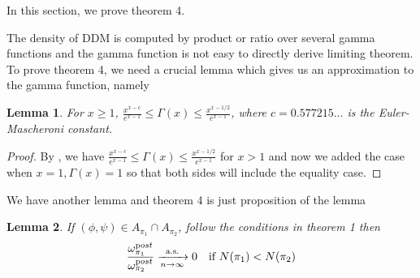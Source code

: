 \documentclass[aoas,preprint]{imsart}
\newtheorem{lemma}{Lemma}
\begin{document}

In this section, we prove theorem 4. 


The density of DDM is computed by product or ratio over several gamma functions and the gamma function is not easy to directly derive limiting theorem.
To prove theorem 4, we need a crucial lemma which gives us an approximation to the gamma function, namely

\begin{lemma}
For $x \geq 1$, $\frac{x^{x - c}}{e^{x - 1}} \leq \Gamma(x) \leq \frac{x^{x-1/2}}{e^{x - 1}}$, where $c = 0.577215...$ is the Euler-Mascheroni constant.
\end{lemma}

\begin{proof}
By \citep{ineq},  we have $\frac{x^{x - c}}{e^{x - 1}} \leq \Gamma(x) \leq \frac{x^{x-1/2}}{e^{x - 1}}$ for $x > 1$ and now we added the case when $x = 1, \Gamma(x) = 1$ so that both sides will include the equality case. 
\end{proof}





We have another lemma and theorem 4 is just proposition of the lemma
\begin{lemma}
 If $(\phi, \psi) \in A_{\pi_1} \cap A_{\pi_2}$, follow the conditions in theorem 1 then 
 \begin{eqnarray*}
    \frac{\omega_{\pi_1}^{\text post}}{\omega_{\pi_2}^{\text post}} \xrightarrow[n\rightarrow\infty]{\text{a.s.}} 0 \quad \text{if } N(\pi_1) < N(\pi_2)\\
 \end{eqnarray*}
\end{lemma}
\end{document}
